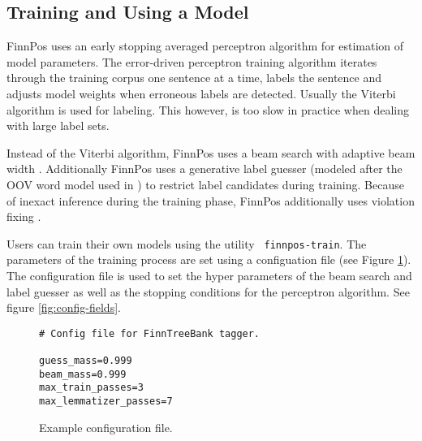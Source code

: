 \documentclass{llncs}
\begin{document}
\subsection{Training and Using a Model}

FinnPos uses an early stopping averaged perceptron algorithm for
estimation of model parameters. The error-driven perceptron training
algorithm iterates through the training corpus one sentence at a time,
labels the sentence and adjusts model weights when erroneous labels
are detected. Usually the Viterbi algorithm \cite{collins/2002} is
used for labeling. This however, is too slow in practice when dealing
with large label sets.

Instead of the Viterbi algorithm, FinnPos uses a beam search with
adaptive beam width \cite{pal/2006}. Additionally FinnPos uses a generative
label guesser (modeled after the OOV word model used in
\cite{brants/2000}) to restrict label candidates during
training. Because of inexact inference during the training phase,
FinnPos additionally uses violation fixing \cite{huang/2012}.

Users can train their own models using the utility {\tt
  finnpos-train}. The parameters of the training process are set using
a configuation file (see Figure \ref{fig:config-file}). The
configuration file is used to set the hyper parameters of the beam
search and label guesser as well as the stopping conditions for the
perceptron algorithm. See figure \ref{fig:config-fields}.

\begin{figure}
\begin{framed}
\begin{verbatim}
# Config file for FinnTreeBank tagger.

guess_mass=0.999
beam_mass=0.999
max_train_passes=3
max_lemmatizer_passes=7
\end{verbatim}
\end{framed}
\caption{Example configuration file.}\label{fig:config-file}
\end{figure}
\end{document}
